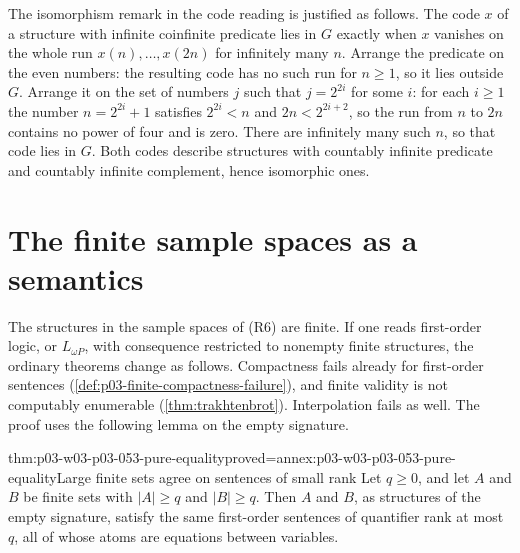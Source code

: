 The isomorphism remark in the code reading is justified as follows. The
code \(x\) of a structure with infinite coinfinite predicate lies in
\(G\) exactly when \(x\) vanishes on the whole run \(x(n),\ldots,x(2n)\) for
infinitely many \(n\). Arrange the predicate on the even numbers: the
resulting code has no such run for \(n\ge1\), so it lies outside
\(G\). Arrange it on the set of numbers \(j\) such that \(j=2^{2i}\) for some \(i\):
for each \(i\ge1\) the number \(n=2^{2i}+1\) satisfies
\(2^{2i}<n\) and \(2n<2^{2i+2}\), so the run from \(n\) to \(2n\)
contains no power of four and is zero. There are infinitely many such
\(n\), so
that code lies in \(G\). Both codes describe structures with countably
infinite predicate and countably infinite complement, hence isomorphic
ones.

\section{The finite sample spaces as a semantics}
\label{sec:p03-w03-p03-053-finite}

The structures in the sample spaces of (R6) are finite. If one reads
first-order logic, or \(L_{\omega P}\), with consequence restricted to
nonempty finite structures, the ordinary theorems change as follows.
Compactness fails already for first-order sentences
(\cref{def:p03-finite-compactness-failure}), and finite validity is not
computably enumerable (\cref{thm:trakhtenbrot}). Interpolation fails as
well. The proof uses the following lemma on the empty signature.

\begin{hblemma}{thm:p03-w03-p03-053-pure-equality}{proved=annex:p03-w03-p03-053-pure-equality}{Large finite sets agree on sentences of small rank}
Let \(q\ge0\), and let \(A\) and \(B\) be finite sets with
\(|A|\ge q\) and \(|B|\ge q\). Then \(A\) and \(B\), as structures of
the empty signature, satisfy the same first-order sentences of
quantifier rank at most \(q\), all of whose atoms are equations between
variables.
\end{hblemma}

